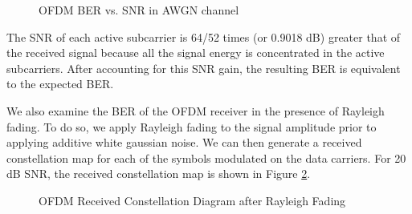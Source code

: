 \documentclass[conference]{IEEEtran}
\begin{document}
		\begin{figure}[H]
			\centering
    			\caption{OFDM BER vs. SNR in AWGN channel}
    			\label{fig::ofdm_awgn_ber}
		\end{figure}
		
		The SNR of each active subcarrier is 64/52 times (or 0.9018 dB) greater that of the received signal because all the signal energy is concentrated in the active subcarriers. After accounting for this SNR gain, the resulting BER is equivalent to the expected BER. 
        
        We also examine the BER of the OFDM receiver in the presence of Rayleigh fading. To do so, we apply Rayleigh fading to the signal amplitude prior to applying additive white gaussian noise. We can then generate a received constellation map for each of the symbols modulated on the data carriers. For 20 dB SNR, the received constellation map is shown in Figure \ref{fig::ofdm_rayleigh_fading}.
        
      \begin{figure}[H]
		\centering
    		\caption{OFDM Received Constellation Diagram after Rayleigh Fading}
    		\label{fig::ofdm_rayleigh_fading}
  	  \end{figure}
    
\end{document}
